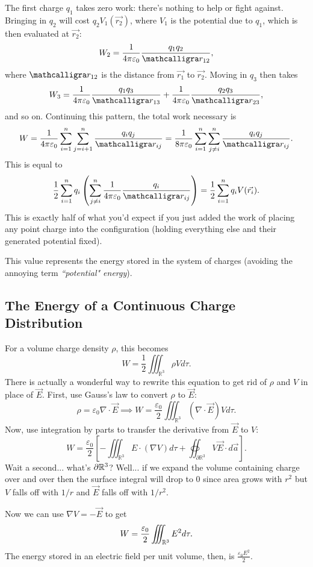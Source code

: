 The first charge $q_1$ takes zero work: there's nothing to help or fight against. Bringing in $q_2$ will cost $q_2V_1(\vec{r_2})$, where $V_1$ is the potential due to $q_1$, which is then evaluated at $\vec{r_2}$:
\[W_2=\frac{1}{4\pi \varepsilon_0}\frac{q_1q_2}{\scr_{12}},\]
where $\scr_{12}$ is the distance from $\vec{r_1}$ to $\vec{r_2}$. Moving in $q_3$ then takes
\[W_3=\frac{1}{4\pi\varepsilon_0}\frac{q_1q_3}{\scr_{13}}+\frac{1}{4\pi\varepsilon_0}\frac{q_2q_3}{\scr_{23}},\]
and so on. Continuing this pattern, the total work necessary is
\[W=\frac{1}{4\pi \varepsilon_0}\sum_{i=1}^n\sum_{j=i+1}^n\frac{q_iq_j}{\scr_{ij}}=\frac{1}{8\pi\varepsilon_0}\sum_{i=1}^n\sum_{j\neq i}^n\frac{q_iq_j}{\scr_{ij}}.\]
This is equal to
\begin{equation}\label{pointchargeenergy}
\frac{1}{2}\sum_{i=1}^nq_i\left(\sum_{j\neq i}^n\frac{1}{4\pi\varepsilon_0}\frac{q_i}{\scr_{ij}}\right)=\frac{1}{2}\sum_{i=1}^nq_iV(\vec{r_i}).
\end{equation}
This is exactly half of what you'd expect if you just added the work of placing any point charge into the configuration (holding everything else and their generated potential fixed).

This value represents the energy stored in the system of charges (avoiding the annoying term \textit{``potential" energy}).

\subsection{The Energy of a Continuous Charge Distribution}

For a volume charge density $\rho$, this becomes
\[W=\frac{1}{2}\iiint_{\mathbb{R}^3}\rho Vd\tau.\]
There is actually a wonderful way to rewrite this equation to get rid of $\rho$ and $V$ in place of $\vec{E}$. First, use Gauss's law to convert $\rho$ to $\vec{E}$:
\[\rho=\varepsilon_0
\nabla\cdot \vec{E}\implies W=\frac{\varepsilon_0}{2}\iiint_{\mathbb{R}^3}(\nabla\cdot \vec{E})Vd\tau.\]
Now, use integration by parts to transfer the derivative from $\vec{E}$ to $V$:
\[W=\frac{\varepsilon_0}{2}\left[-\iiint_{\mathbb{R}^3}E\cdot(\nabla V)d\tau+\oiint_{\partial \mathbb{R}^3}V\vec{E}\cdot d\vec{a}\right].\]
Wait a second... what's $\partial \mathbb R^3$? Well... if we expand the volume containing charge over and over then the surface integral will drop to $0$ since area grows with $r^2$ but $V$ falls off with $1/r$ and $\vec{E}$ falls off with $1/r^2$.

Now we can use $\nabla V=-\vec{E}$ to get
\begin{equation}\label{energyelectric}
W=\frac{\varepsilon_0}{2}\iiint_{\mathbb R^3}E^2d\tau.
\end{equation}
The energy stored in an electric field per unit volume, then, is $\frac{\varepsilon_0E^2}{2}$.

